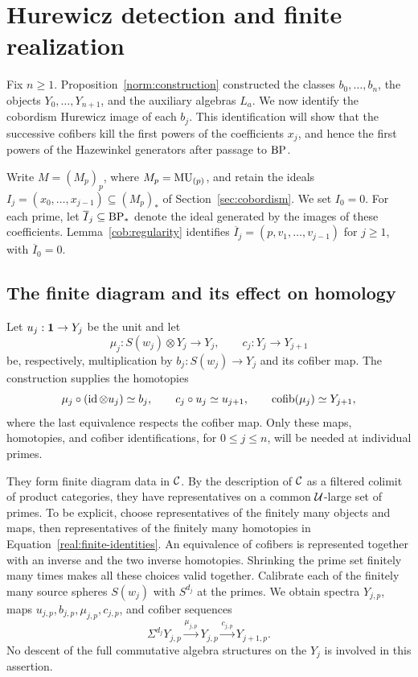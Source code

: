 \section{Hurewicz detection and finite realization}
\label{sec:realization}

Fix \(n\geq 1\).  Proposition~\ref{norm:construction} constructed the
classes \(b_0,\ldots,b_n\), the objects \(Y_0,\ldots,Y_{n+1}\), and
the auxiliary algebras \(L_a\).  We now identify the cobordism Hurewicz
image of each \(b_j\).  This identification will show that the successive
cofibers kill the first powers of the coefficients \(x_j\), and hence
the first powers of the Hazewinkel generators after passage to \(\mathrm{BP}\).

Write \(M=(M_p)_p\), where \(M_p=\mathrm{MU}_{(p)}\), and retain the ideals
\(I_j=(x_0,\ldots,x_{j-1})\subseteq (M_p)_*\) of
Section~\ref{sec:cobordism}.  We set \(I_0=0\).  For each prime, let
\(\overline I_j\subseteq\mathrm{BP}_*\) denote the ideal generated by the
images of these coefficients.  Lemma~\ref{cob:regularity} identifies
\(\overline I_j=(p,v_1,\ldots,v_{j-1})\) for \(j\geq 1\), with
\(\overline I_0=0\).

\subsection{The finite diagram and its effect on homology}

Let \(u_j:\mathbf 1\to Y_j\) be the unit and let
\[
 \mu_j:S(w_j)\otimes Y_j\longrightarrow Y_j,
 \qquad c_j:Y_j\longrightarrow Y_{j+1}
\]
be, respectively, multiplication by \(b_j:S(w_j)\to Y_j\) and its
cofiber map.  The construction supplies the homotopies
\begin{equation}
 \mu_j\circ(\operatorname{id}\otimes u_j)\simeq b_j,
 \qquad c_j\circ u_j\simeq u_{j+1},
 \qquad \operatorname{cofib}(\mu_j)\simeq Y_{j+1},
 \label{real:finite-identities}
\end{equation}
where the last equivalence respects the cofiber map.  Only these maps,
homotopies, and cofiber identifications, for \(0\leq j\leq n\),
will be needed at individual primes.

They form finite diagram data in \(\mathcal C\).  By the description of
\(\mathcal C\) as a filtered colimit of product categories, they have
representatives on a common \(\mathcal U\)-large set of primes.  To be
explicit, choose representatives of the finitely many objects and maps,
then representatives of the finitely many homotopies in
Equation~\eqref{real:finite-identities}.  An equivalence of cofibers is
represented together with an inverse and the two inverse homotopies.
Shrinking the prime set finitely many times makes all these choices
valid together.  Calibrate each of the finitely many source spheres
\(S(w_j)\) with \(S^{d_j}\) at the primes.  We obtain spectra
\(Y_{j,p}\), maps \(u_{j,p},b_{j,p},\mu_{j,p},c_{j,p}\), and
cofiber sequences
\begin{equation}
 \Sigma^{d_j}Y_{j,p}\xrightarrow{\mu_{j,p}}Y_{j,p}
 \xrightarrow{c_{j,p}}Y_{j+1,p}.
 \label{real:primewise-cofibers}
\end{equation}
No descent of the full commutative algebra structures on the \(Y_j\)
is involved in this assertion.

